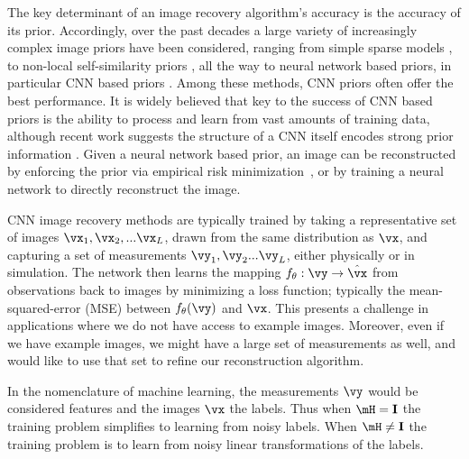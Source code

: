\documentclass{article}
\newcommand\img{\vx}
\newcommand\obs{\vy}
\begin{document}
The key determinant of an image recovery algorithm's accuracy is the accuracy of its prior. 
Accordingly, over the past decades a large variety of increasingly complex image priors have been considered, ranging from simple sparse models \cite{SureShrink}, to non-local self-similarity priors \cite{BM3D}, all the way to neural network based priors, in particular CNN based priors \cite{DnCNN}. Among these methods, CNN priors often offer the best performance.
It is widely believed that key to the success of CNN based priors is the ability to process and learn from vast amounts of training data, although recent work suggests the structure of a CNN itself encodes strong prior information \cite{DeepImagePrior}.
Given a neural network based prior, an image can be reconstructed by enforcing the prior via empirical risk minimization~\cite{hand_global_2017}, or by training a neural network to directly reconstruct the image.

CNN image recovery methods are typically trained by taking a representative set of images $\img_1, \img_2, ... \img_L$, drawn from the same distribution as $\img$, and capturing a set of measurements $\obs_1,\obs_2 ... \obs_L$, either physically or in simulation.
The network then learns the mapping $f_\theta: \obs\rightarrow \hat{\img}$ from observations back to images by minimizing a loss function; typically the mean-squared-error (MSE) between $f_\theta(\obs)$ and $\img$. 
This presents a challenge in applications where we do not have access to example images. 
Moreover, even if we have example images, we might have a large set of measurements as well, and would like to use that set to refine our reconstruction algorithm. 

In the nomenclature of machine learning, the measurements $\obs$ would be considered features and the images $\img$ the labels. Thus when $\mH=\mathbf{I}$ the training problem simplifies to learning from noisy labels. When $\mH\neq\mathbf{I}$ the training problem is to learn from noisy linear transformations of the labels.
\end{document}
